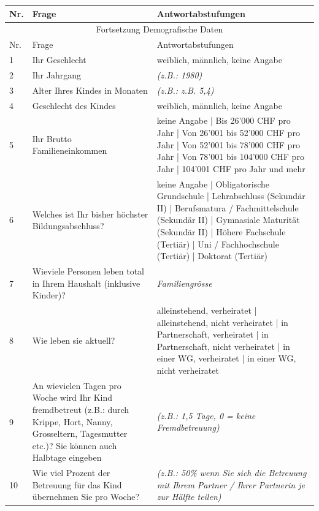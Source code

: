 \begin{longtable}[c]{ |p{1em}|p{16em}|p{16em}| }
 
  \hline
  Nr. & Frage & Antwortabstufungen \\
  \hline
  \endfirsthead
 
  \hline
  \multicolumn{3}{|c|}{ Fortsetzung Demografische Daten}\\
  \hline
  Nr. & Frage & Antwortabstufungen \\
  \hline
  \endhead
 
  \hline
  \endfoot
 
  \hline\hline
  \endlastfoot
 
  1 & Ihr Geschlecht & weiblich, männlich,  keine Angabe \\
  2 & Ihr Jahrgang & \textit{(z.B.: 1980)}  \\
  3 & Alter Ihres Kindes in Monaten & \textit{(z.B.: z.B. 5,4)}\\
  4 & Geschlecht des Kindes & weiblich, männlich, keine Angabe \\
  5 & Ihr Brutto Familieneinkommen & keine Angabe | Bis 26’000 CHF pro Jahr | Von 26’001 bis 52’000 CHF pro Jahr | Von 52’001 bis 78’000 CHF pro Jahr | Von 78’001 bis 104’000 CHF pro Jahr | 104’001 CHF pro Jahr und mehr \\
  6 & Welches ist Ihr bisher höchster Bildungsabschluss? & keine Angabe | Obligatorische Grundschule | Lehrabschluss (Sekundär II) | Berufsmatura / Fachmittelschule (Sekundär II) | Gymnasiale Maturität (Sekundär II) | Höhere Fachschule (Tertiär) | Uni / Fachhochschule (Tertiär) | Doktorat (Tertiär) \\
  7 & Wieviele Personen leben total in Ihrem Haushalt (inklusive Kinder)? & \textit{Familiengrösse} \\
  8 & Wie leben sie aktuell? & alleinstehend, verheiratet | alleinstehend, nicht verheiratet | in Partnerschaft, verheiratet | in Partnerschaft, nicht verheiratet | in einer WG, verheiratet | in einer WG, nicht verheiratet \\
  9 & An wievielen Tagen pro Woche wird Ihr Kind fremdbetreut (z.B.: durch Krippe, Hort, Nanny, Grosseltern, Tagesmutter etc.)? Sie können auch Halbtage eingeben & \textit{(z.B.: 1,5 Tage, 0 = keine Fremdbetreuung)} \\
  10 & Wie viel Prozent der Betreuung für das Kind übernehmen Sie pro Woche? & \textit{(z.B.: 50\% wenn Sie sich die Betreuung mit Ihrem Partner / Ihrer Partnerin je zur Hälfte teilen)} \\
  
\end{longtable}

